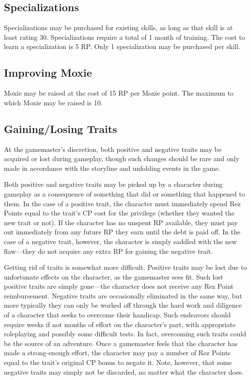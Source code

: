 \subsection{Specializations}

Specializations may be purchased for existing
skills, as long as that skill is at least
rating 30. Specializations require a total 
of 1 month of training. The cost to learn a 
specialization is 5 RP. Only 1 specialization 
may be purchased per skill.

\subsection{Improving Moxie}

Moxie may be raised at the cost of 15 RP per 
Moxie point. The maximum to which Moxie 
may be raised is 10.

\subsection{Gaining/Losing Traits}

At the gamemaster's discretion, both positive 
and negative traits may be acquired or lost 
during gameplay, though such changes should 
be rare and only made in accordance with the 
storyline and unfolding events in the game.

Both positive and negative traits may be 
picked up by a character during gameplay 
as a consequence of something that did or 
something that happened to them. In the case 
of a positive trait, the character must immediately
spend Rez Points equal to the trait's CP
cost for the privilege (whether they wanted 
the new trait or not). If the character has no 
unspent RP available, they must pay out immediately
from any future RP they earn until
the debt is paid off. In the case of a negative 
trait, however, the character is simply saddled 
with the new flaw—they do not acquire any 
extra RP for gaining the negative trait.

Getting rid of traits is somewhat more 
difficult. Positive traits may be lost due to 
unfortunate effects on the character, as the 
gamemaster sees fit. Such lost positive traits 
are simply gone—the character does not 
receive any Rez Point reimbursement. Negative
traits are occasionally eliminated in the
same way, but more typically they can only 
be worked off through the hard work and 
diligence of a character that seeks to overcome
their handicap. Such endeavors should
require weeks if not months of effort on the 
character's part, with appropriate roleplaying
and possibly some difficult tests. In fact,
overcoming such traits could be the source 
of an adventure. Once a gamemaster feels 
that the character has made a strong-enough 
effort, the character may pay a number of 
Rez Points equal to the trait's original CP 
bonus to negate it. Note, however, that some 
negative traits may simply not be discarded, 
no matter what the character does.

